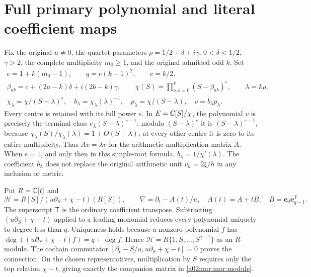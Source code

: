 \section{Full primary polynomial and literal coefficient maps}
Fix the original $u\ne0$, the quartet parameters
$\rho=1/2+\delta+i\gamma$, $0<\delta<1/2$, $\gamma>2$, the
complete multiplicity $m_0\ge1$, and the original admitted odd $k$.
Set
\begin{equation}\tag{MAR1}\label{a02mar:mar:objects}
 \begin{gathered}
 e=1+k(m_0-1),\qquad q=e(k+1)^2,\qquad c=k/2,\\
 \beta_{ab}=c+(2a-k)\delta+i(2b-k)\gamma,\qquad
 \chi(S)=\prod_{a,b=0}^{k}(S-\beta_{ab})^e,\qquad\lambda=k\rho,\\
 \chi_\lambda=\chi/(S-\lambda)^e,\quad
 b_\lambda=\chi_\lambda(\lambda)^{-1},\quad
 p_\lambda=\chi/(S-\lambda),\quad v=b_\lambda p_\lambda.
 \end{gathered}
\end{equation}
Every centre is retained with its full power $e$. In $E=\mathbb C[S]/\chi$,
the polynomial $v$ is precisely the terminal class
$e_\lambda(S-\lambda)^{e-1}$: modulo $(S-\lambda)^e$ it is
$(S-\lambda)^{e-1}$, because
$\chi_\lambda(S)/\chi_\lambda(\lambda)=1+O(S-\lambda)$;
at every other centre it is zero to its entire multiplicity.
Thus $A v=\lambda v$ for the arithmetic multiplication matrix $A$.
When $e=1$, and only then in this simple-root formula,
$b_\lambda=1/\chi'(\lambda)$. The coefficient $b_\lambda$ does not
replace the original arithmetic unit $v_h=2\xi/h$ in any inclusion or metric.

Put $R=\mathbb C[t]$ and
\begin{equation}\tag{MAR2}\label{a02mar:mar:module}
 \mathscr H=R[S]/(u\partial_S+\chi-t)(R[S]),\qquad
 \nabla=\partial_t-A(t)/u,
 \quad A(t)=A+tB,\quad B=\mathbf e_0\mathbf e_{q-1}^{\mathsf T}.
\end{equation}
The superscript $\mathsf T$ is the ordinary coefficient transpose.
Subtracting $(u\partial_S+\chi-t)$ applied to a leading monomial
reduces every polynomial uniquely to degree less than $q$. Uniqueness
holds because a nonzero polynomial $f$ has
$\deg((u\partial_S+\chi-t)f)=q+\deg f$. Hence
$\mathscr H=R\{1,S,\ldots,S^{q-1}\}$ as an $R$-module.
The cochain commutator
$[\partial_t-S/u,u\partial_S+\chi-t]=0$ proves the connection.
On the chosen representatives, multiplication by $S$ requires only
the top relation $\chi-t$, giving exactly the companion matrix in
\eqref{a02mar:mar:module}.

